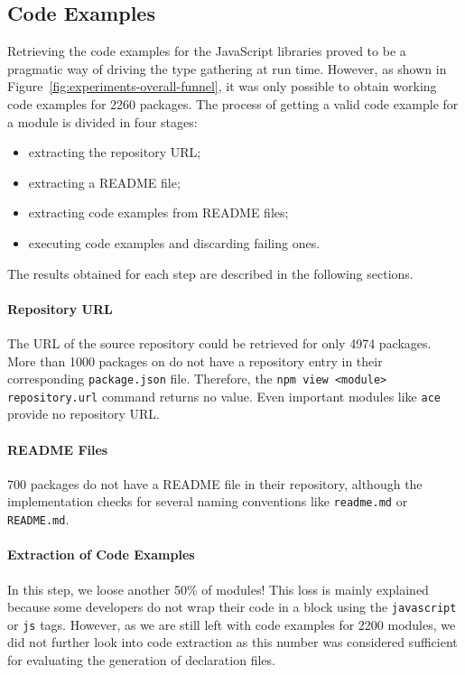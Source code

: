 \documentclass[english,cleveref,autoref,submission]{programming}
\newcommand{\figref}[1]{Figure~\ref{#1}}
\begin{document}
\subsection{Code Examples}
Retrieving the code examples for the JavaScript libraries proved to be
a pragmatic way of driving the type gathering at run time. However, as
shown in \figref{fig:experiments-overall-funnel}, it was only possible
to obtain working code examples for 2260 packages. The
process of getting a valid code example for a module is divided in four
stages: 
\begin{itemize}
\item extracting the repository URL;
\item extracting a README file;
\item extracting code examples from README files;
\item executing code examples and discarding failing ones.
\end{itemize}

The results obtained for each step are described in the
following sections. 

\paragraph*{Repository URL}
The URL of the source repository could be retrieved for only 4974
packages. More than 1000 packages on \NPM{} do not have a repository
entry in their corresponding \texttt{package.json} file. Therefore, the
\texttt{npm view <module> repository.url} command returns no
value. Even important modules like \texttt{ace} provide no repository URL.

\paragraph*{README Files}
700 packages do not have a README file in their repository, although
the implementation checks for several naming conventions like
\texttt{readme.md} or \texttt{README.md}. 

\paragraph*{Extraction of Code Examples}
In this step, we loose another 50\% of modules! This loss is mainly
explained because some developers do not wrap their code in a block
using the \texttt{javascript} or \texttt{js} tags. However, as we are
still left with code examples for 2200 modules, we did not further
look into code extraction as this number was considered sufficient for
evaluating the generation of declaration files. 
\end{document}
